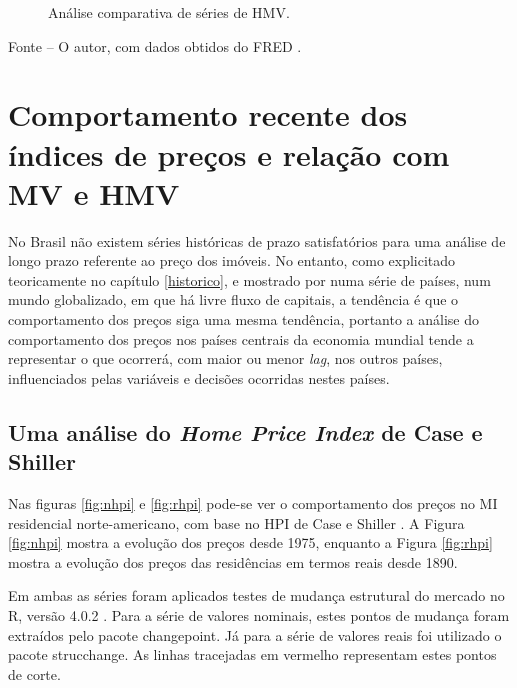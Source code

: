 \documentclass[
	12pt,				%
	oneside,			%
	a4paper,			%
	chapter=TITLE,		%
	section=TITLE,		%
	english,			%
	brazil				%
	]{abntex2}
\newcommand{\pkg}[1]{{\normalfont\fontseries{b}\selectfont #1}}
\let\proglang=\textsf
\newcommand{\bcenter}{\begin{center}}
\newcommand{\ecenter}{\end{center}}
\begin{document}
\begin{refsection}
\begin{figure}[H]
{}

\caption{Análise comparativa de séries de \gls{HMV}.}\label{fig:twoseries}
\end{figure}
\bcenter

\small Fonte -- O autor, com dados obtidos do FRED \autocite{RSAHORUSQ156S,CSUSHPINSA}.
\ecenter

\hypertarget{comportamento-recente-dos-uxedndices-de-preuxe7os-e-relauxe7uxe3o-com-e}{%
\section{\texorpdfstring{Comportamento recente dos índices de preços e relação com \gls{MV} e \gls{HMV}}{Comportamento recente dos índices de preços e relação com  e }}\label{comportamento-recente-dos-uxedndices-de-preuxe7os-e-relauxe7uxe3o-com-e}}

No Brasil não existem séries históricas de prazo satisfatórios para uma análise
de longo prazo referente ao preço dos imóveis. No entanto, como explicitado
teoricamente no capítulo \ref{historico}, e mostrado por \textcite{ADAMS2010} numa
série de países, num mundo globalizado, em que há livre fluxo de capitais, a
tendência é que o comportamento dos preços siga uma mesma tendência, portanto a
análise do comportamento dos preços nos países centrais da economia mundial
tende a representar o que ocorrerá, com maior ou menor \emph{lag}, nos outros países,
influenciados pelas variáveis e decisões ocorridas nestes países.

\hypertarget{uma-anuxe1lise-do-de-case-e-shiller}{%
\subsection{\texorpdfstring{Uma análise do \emph{Home Price Index} de Case e Shiller}{Uma análise do  de Case e Shiller}}\label{uma-anuxe1lise-do-de-case-e-shiller}}

Nas figuras \ref{fig:nhpi} e \ref{fig:rhpi} pode-se ver o comportamento dos
preços no \gls{MI} residencial norte-americano, com base no \gls{HPI} de Case e
Shiller \autocite{NBERw2506}. A Figura \ref{fig:nhpi} mostra a evolução dos preços
desde 1975, enquanto a Figura \ref{fig:rhpi} mostra a evolução dos preços
das residências em termos reais desde 1890.

Em ambas as séries foram aplicados testes de mudança estrutural do mercado no
\proglang{R}, versão 4.0.2 \autocite{R}.
Para a série de valores nominais, estes pontos de mudança foram extraídos pelo
pacote \pkg{changepoint}. Já para a série de valores reais foi utilizado o
pacote \pkg{strucchange}. As linhas tracejadas em vermelho representam estes
pontos de corte.
\begin{figure}[H]


\end{figure}
\end{refsection}
\end{document}
